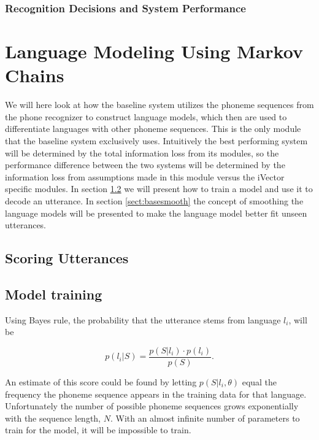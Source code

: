 \subsection{Recognition Decisions and System Performance}


\chapter{Language Modeling Using Markov Chains}

We will here look at how the baseline system utilizes the phoneme sequences from the phone recognizer to construct language models, which then are used to differentiate languages with other phoneme sequences. This is the only module that the baseline system exclusively uses. Intuitively the best performing system will be determined by the total information loss from its modules, so the performance difference between the two systems will be determined by the information loss from assumptions made in this module versus the iVector specific modules. In section \ref{sect:basetrain} we will present how to train a model and use it to decode an utterance. In section \ref{sect:basesmooth} the concept of smoothing the language models will be presented to make the language model better fit unseen utterances.

\section{Scoring Utterances}
\label{sect:basescore}

\section{Model training}
\label{sect:basetrain}

Using Bayes rule, the probability that the utterance stems from language $l_i$, will be

\begin{equation}
\label{basebayes}
p(l_i|S) = \frac{p(S|l_i) \cdot p(l_i)}{p(S)}.
\end{equation}


An estimate of this score could be found by letting $p(S|l_i, \theta)$ equal the frequency the phoneme sequence appears in the training data for that language. Unfortunately the number of possible phoneme sequences grows exponentially with the sequence length, $N$. With an almost infinite number of parameters to train for the model, it will be impossible to train. 

